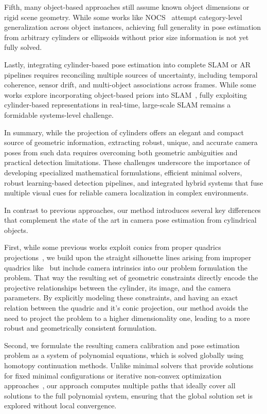 Fifth, many object-based approaches still assume known object dimensions or rigid scene geometry. While some works like NOCS~\cite{Wang2019} attempt category-level generalization across object instances, achieving full generality in pose estimation from arbitrary cylinders or ellipsoids without prior size information is not yet fully solved.

Lastly, integrating cylinder-based pose estimation into complete SLAM or AR pipelines requires reconciling multiple sources of uncertainty, including temporal coherence, sensor drift, and multi-object associations across frames. While some works explore incorporating object-based priors into SLAM~\cite{Nicholson2019,Garg2020}, fully exploiting cylinder-based representations in real-time, large-scale SLAM remains a formidable systems-level challenge.

In summary, while the projection of cylinders offers an elegant and compact source of geometric information, extracting robust, unique, and accurate camera poses from such data requires overcoming both geometric ambiguities and practical detection limitations. These challenges underscore the importance of developing specialized mathematical formulations, efficient minimal solvers, robust learning-based detection pipelines, and integrated hybrid systems that fuse multiple visual cues for reliable camera localization in complex environments.



In contrast to previous approaches, our method introduces several key differences that complement the state of the art in camera pose estimation from cylindrical objects.

First, while some previous works exploit conics from proper quadrics projections~\cite{Teramoto2002,Zins2022}, we build upon the straight silhouette lines arising from improper quadrics like~\cite{gummeson22pose} but include camera intrinsics into our problem formulation the problem. That way the resulting set of geometric constraints directly encode the projective relationships between the cylinder, its image, and the camera parameters. By explicitly modeling these constraints, and having an exact relation between the quadric and it's conic projection, our method avoids the need to project the problem to a higher dimensionality one, leading to a more robust and geometrically consistent formulation.

Second, we formulate the resulting camera calibration and pose estimation problem as a system of polynomial equations, which is solved globally using homotopy continuation methods. Unlike minimal solvers that provide solutions for fixed minimal configurations or iterative non-convex optimization approaches~\cite{Rubino2018, Gaudilliere2023}, our approach computes multiple paths that ideally cover all solutions to the full polynomial system, ensuring that the global solution set is explored without local convergence.

